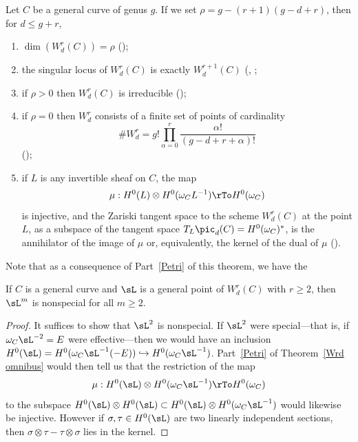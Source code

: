 \begin{theorem}\label{Wrd omnibus}
Let $C$ be a general curve of genus $g$. If we set $\rho = g - (r+1)(g-d+r)$, then for $d \leq g+r$,
\begin{enumerate}

\item $\dim(W^r_d(C)) = \rho$ (\cite{Griffiths-Harris-BN});

\item\label{sing wrd} the singular locus of $W^r_d(C)$ is exactly $W^{r+1}_d(C)$
(\cite{Gieseker-Petri}, \cite{Lazarsfeld-Petri};
\label{irr wrd} 

\item if $\rho > 0$ then $W^r_d(C)$ is irreducible (\cite{MR611386});

\item\label{rho=0} if $\rho = 0$ then $W^r_d$ consists of a finite set of  points of cardinality
$$
\#W^r_d = g! \prod_{\alpha=0}^r \frac{\alpha!}{(g-d+r+\alpha)!}
$$
(\cite{MR323792});

\item\label{Petri} if $L$ is any invertible sheaf on $C$, the map
$$
\mu : H^0(L) \otimes H^0(\omega_CL^{-1}) \rTo H^0(\omega_C)
$$
is injective, and the Zariski tangent space to the scheme $W^r_d(C)$ at the point $L$, as a subspace
of the tangent space $T_L\pic_d(C) = H^0(\omega_C)^*$, is the annihilator of the image of $\mu$
or, equivalently, the kernel of the dual of $\mu$ (\cite{Gieseker-Petri}).
\end{enumerate}
\end{theorem}

Note that as a consequence of Part~\ref{Petri} of this theorem, we have the

\begin{corollary}\label{2L nonspecial}
If $C$ is a general curve and $\sL$ is a general point of $W^r_d(C)$ with $r\geq 2$,
 then $\sL^m$ is nonspecial for all $m \geq 2$.
\end{corollary}

\begin{proof}
It suffices to show that $\sL^2$ is nonspecial. If $\sL^2$ were special---that is, if $\omega_C\sL^{-2} = E$ were effective---then we would have an inclusion $H^0(\sL) = H^0(\omega_C\sL^{-1}(-E)) \hookrightarrow H^0(\omega_C\sL^{-1})$. Part~\ref{Petri} of Theorem~\ref{Wrd omnibus} would then tell us that the restriction of the map 
 $$
\mu : H^0(\sL) \otimes H^0(\omega_C\sL^{-1}) \rTo H^0(\omega_C)
$$
to the subspace $H^0(\sL) \otimes H^0(\sL) \subset H^0(\sL) \otimes H^0(\omega_C\sL^{-1})$ would likewise be injective.
However if $\sigma, \tau \in H^0(\sL)$ are two linearly independent sections, then $\sigma \otimes \tau - \tau \otimes \sigma$ lies in the kernel.
\end{proof}

